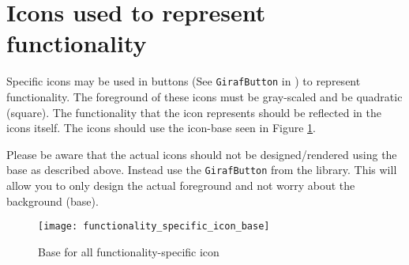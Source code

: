 \section{Icons used to represent functionality}
Specific icons may be used in buttons (See \texttt{GirafButton} in \gc) to represent functionality. The foreground of these icons must be gray-scaled and be quadratic (square). The functionality that the icon represents should be reflected in the icons itself. The icons should use the icon-base seen in Figure \ref{fig:functionality_specific_icon_base}.

\begin{note}
	Please be aware that the actual icons should not be designed/rendered using the base as described above. Instead use the \texttt{GirafButton} from the \gc library. This will allow you to only design the actual foreground and not worry about the background (base).
\end{note}

\begin{figure}[h]
	\centering
	\texttt{[image: functionality\_specific\_icon\_base]}
	\caption{Base for all functionality-specific icon}
	\label{fig:functionality_specific_icon_base}
\end{figure}
